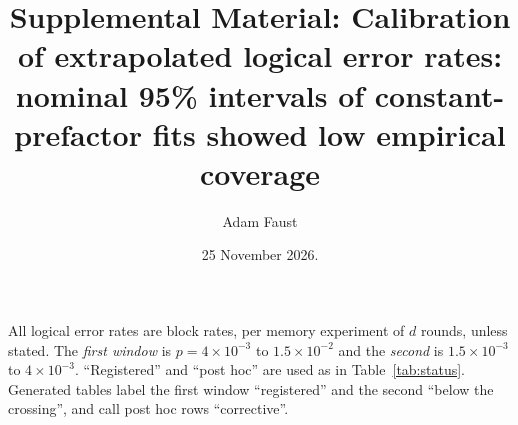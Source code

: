 \documentclass[aps,pre,onecolumn,superscriptaddress,nofootinbib,10pt]{revtex4-2}
\newif\ifdraftmark
\begin{document}
\small
\title{Supplemental Material: Calibration of extrapolated logical error rates: nominal 95\% intervals of constant-prefactor fits showed low empirical coverage}
\author{Adam Faust}
\date{\ifdraftmark DRAFT v14, not for distribution. \fi 25 November 2026.}
\maketitle
All logical error rates are block rates, per memory experiment of $d$ rounds, unless stated. The \emph{first window} is $p=4\times10^{-3}$ to $1.5\times10^{-2}$ and the \emph{second} is $1.5\times10^{-3}$ to $4\times10^{-3}$. ``Registered'' and ``post hoc'' are used as in Table~\ref{tab:status}. Generated tables label the first window ``registered'' and the second ``below the crossing'', and call post hoc rows ``corrective''.
\end{document}
